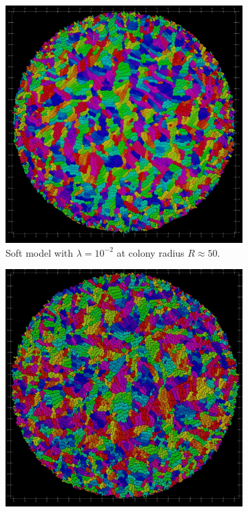 \documentclass[conference]{IEEEtran}
\begin{document}
\begin{figure}[h]
    \centering
    \begin{subfigure}[b]{0.49\columnwidth}
        \centering
        \includegraphics[width=\linewidth]{figures/orientation_comparisons/r50_soft_e-2.jpeg}
        \caption{Soft model with $\lambda = 10^{-2}$ at colony radius $R \approx 50$.}
    \end{subfigure}
    \begin{subfigure}[b]{0.49\columnwidth}
        \centering
        \includegraphics[width=\linewidth]{figures/orientation_comparisons/r50_hard_e-2.jpeg}

\end{subfigure}
\end{figure}
\end{document}
